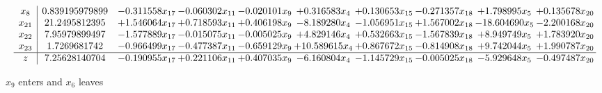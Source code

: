 \documentclass[10pt]{article}
\begin{document}
\[\begin{array}{c| c c@{\hskip 2pt} c@{\hskip 2pt} c@{\hskip 2pt} c@{\hskip 2pt} c@{\hskip 2pt} c@{\hskip 2pt} c@{\hskip 2pt} c@{\hskip 2pt} }
 x_{8}   &  0.839195979899 & -0.311558 x_{17} & -0.060302 x_{11} & -0.020101 x_{9} & + 0.316583 x_{4} & + 0.130653 x_{15} & -0.271357 x_{18} & + 1.798995 x_{5} & + 0.135678 x_{20}\\
 x_{21}   &  21.2495812395 & + 1.546064 x_{17} & + 0.718593 x_{11} & + 0.406198 x_{9} & -8.189280 x_{4} & -1.056951 x_{15} & + 1.567002 x_{18} & -18.604690 x_{5} & -2.200168 x_{20}\\
 x_{22}   &  7.95979899497 & -1.577889 x_{17} & -0.015075 x_{11} & -0.005025 x_{9} & + 4.829146 x_{4} & + 0.532663 x_{15} & -1.567839 x_{18} & + 8.949749 x_{5} & + 1.783920 x_{20}\\
 x_{23}   &  1.7269681742 & -0.966499 x_{17} & -0.477387 x_{11} & -0.659129 x_{9} & + 10.589615 x_{4} & + 0.867672 x_{15} & -0.814908 x_{18} & + 9.742044 x_{5} & + 1.990787 x_{20}\\
\hline
z    &  7.25628140704 & -0.190955 x_{17} & + 0.221106 x_{11} & + 0.407035 x_{9} & -6.160804 x_{4} & -1.145729 x_{15} & -0.005025 x_{18} & -5.929648 x_{5} & -0.497487 x_{20}\\
\end{array}\]


 $ x_{9} $ enters and $ x_{6} $ leaves 
\end{document}
